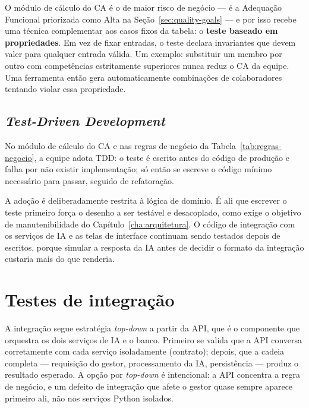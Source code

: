 \documentclass[a4paper,12pt,oneside,openany]{book}
\newif\iforientacoes
\newcommand{\orientacao}[1]{%
    \iforientacoes
        \begin{quote}
        \small\itshape\textbf{Orientação:} #1
        \end{quote}
    \fi
}
\begin{document}
O módulo de cálculo do CA é o de maior risco de negócio --- é a Adequação
Funcional priorizada como Alta na Seção~\ref{sec:quality-goals} --- e por isso
recebe uma técnica complementar aos casos fixos da tabela: o \textbf{teste
baseado em propriedades}. Em vez de fixar entradas, o teste declara invariantes
que devem valer para qualquer entrada válida. Um exemplo: substituir um membro
por outro com competências estritamente superiores nunca reduz o CA da equipe.
Uma ferramenta então gera automaticamente combinações de colaboradores tentando
violar essa propriedade.

\subsection{\textit{Test-Driven Development}}

No módulo de cálculo do CA e nas regras de negócio da
Tabela~\ref{tab:regras-negocio}, a equipe adota TDD: o teste é escrito antes do
código de produção e falha por não existir implementação; só então se escreve o
código mínimo necessário para passar, seguido de refatoração.

A adoção é deliberadamente restrita à lógica de domínio. É ali que escrever o
teste primeiro força o desenho a ser testável e desacoplado, como exige o
objetivo de manutenibilidade do Capítulo~\ref{cha:arquitetura}. O código de
integração com os serviços de IA e as telas de interface continuam sendo
testados depois de escritos, porque simular a resposta da IA antes de decidir o
formato da integração custaria mais do que renderia.

\section{Testes de integração}

\orientacao{Expliquem como os componentes serão integrados e testados. Quando
fizer sentido, indiquem a estratégia adotada (por exemplo, \textit{top-down},
\textit{bottom-up}, \textit{depth-first} ou \textit{breadth-first}) e
justifiquem-na. Descrevam também como testes de regressão serão utilizados
após alterações.}

A integração segue estratégia \textit{top-down} a partir da API, que é o
componente que orquestra os dois serviços de IA e o banco. Primeiro se valida
que a API conversa corretamente com cada serviço isoladamente (contrato);
depois, que a cadeia completa --- requisição do gestor, processamento da IA,
persistência --- produz o resultado esperado. A opção por \textit{top-down} é
intencional: a API concentra a regra de negócio, e um defeito de integração que
afete o gestor quase sempre aparece primeiro ali, não nos serviços Python
isolados.
\end{document}
